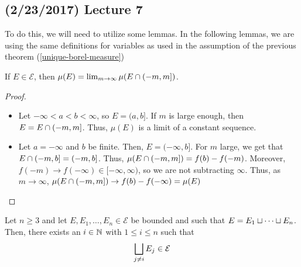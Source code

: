 \documentclass[11pt,leqno,oneside]{amsbook}
\numberwithin{thm}{section}
\newcommand{\Ep}{\mathcal{E}} %
\begin{document}
\subsection*{(2/23/2017) Lecture 7}
To do this, we will need to utilize some lemmas. In the following
lemmas, we are using the same definitions for variables as used in the
assumption of the previous theorem (\ref{unique-borel-measure})
\begin{lem}\label{lebesgue-lem-1}
  If $E \in \Ep$, then $\mu(E) = \lim_{m \to \infty} \mu(E \cap (-m,m])$.
\end{lem}
\begin{proof}
  \begin{itemize}
  \item Let $-\infty < a < b < \infty$, so $E = (a,b]$. If $m$ is
    large enough, then $E = E \cap (-m,m]$. Thus, $\mu(E)$ is a
    limit of a constant sequence.
  \item Let $a = -\infty$ and $b$ be finite. Then, $E =
    (-\infty,b]$. For $m$ large, we get that $E \cap (-m,b] =
    (-m,b]$. Thus, $\mu(E \cap (-m,m]) = f(b) -
    f(-m)$. Moreover, $f(-m) \to f(-\infty) \in [-\infty,\infty)$, so
    we are not subtracting $\infty$. Thus, as $m \to \infty$, $\mu(E
    \cap (-m,m]) \to f(b) - f(-\infty) = \mu(E)$
  \end{itemize}
\end{proof}
\begin{lem}\label{lebesgue-lem-2}
  Let $n \geq 3$ and let $E,E_1, \ldots, E_n \in \Ep$ be bounded and
  such that $E = E_1 \sqcup \cdots \sqcup E_n$. Then, there exists
  an $i \in {\mathbb N}$ with $1 \leq i \leq n$ such that \[
    \Dunion_{j \neq i} E_j \in \Ep
  \]
\end{lem}
\end{document}
